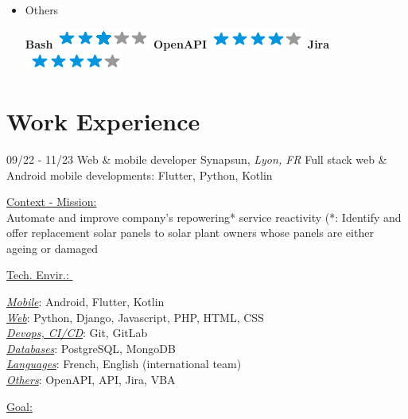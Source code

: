\documentclass[]{friggeri-cv}
\begin{document}
\begin{flushright}
\begin{multicols}{3}
\begin{itemize}
\item Others \
\begin{flushright}

\textbf{Bash}\includegraphics[scale=0.40]{res/img/3stars.png}
\textbf{OpenAPI}\includegraphics[scale=0.40]{res/img/4stars.png}
\textbf{Jira}\includegraphics[scale=0.40]{res/img/4stars.png}
\end{flushright}            


        \end{itemize}
        \end{multicols}
        \end{flushright}
        \vspace*{-0.65cm}
\section{Work Experience}
\vspace*{-0.25cm}

\begin{entrylist}
  \entry
    {09/22 - 11/23}
    {Web \& mobile developer}
    {Synapsun, \textit{Lyon, FR}}
    {Full stack web \& Android mobile developments: \hspace*{8mm}Flutter, Python, Kotlin}
\end{entrylist}
\vspace{-10pt}
\begin{minipage}[t]{0.65\linewidth}
\underline{Context - Mission: }\\
Automate and improve company's repowering* service reactivity (*: Identify and offer replacement solar panels to solar plant owners whose panels are either ageing or damaged\\
\end{minipage} %
\begin{minipage}[t]{0.38\textwidth}
    \underline{Tech. Envir.: }\
    \vspace{1mm}
    
\underline{\textit{Mobile}}: Android, Flutter, Kotlin\\
\underline{\textit{Web}}: Python, Django, Javascript, PHP, HTML, CSS\\
\underline{\textit{Devops, CI/CD}}: Git, GitLab\\
\underline{\textit{Databases}}: PostgreSQL, MongoDB\\
\underline{\textit{Languages}}: French, English (international team)\\
\underline{\textit{Others}}: OpenAPI, API, Jira, VBA
    \end{minipage}
\vspace{1.5mm}
\underline{Goal: }\\
\end{document}
